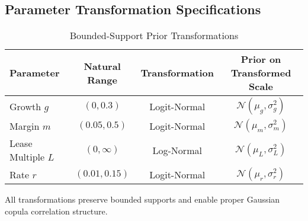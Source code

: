 \subsection{Parameter Transformation Specifications}

\begin{table}[h]
\centering
\caption{Bounded-Support Prior Transformations}
\begin{tabular}{lccc}
\toprule
Parameter & Natural Range & Transformation & Prior on Transformed Scale \\
\midrule
Growth $g$ & $(0, 0.3)$ & Logit-Normal & $\mathcal{N}(\mu_g, \sigma_g^2)$ \\
Margin $m$ & $(0.05, 0.5)$ & Logit-Normal & $\mathcal{N}(\mu_m, \sigma_m^2)$ \\
Lease Multiple $L$ & $(0, \infty)$ & Log-Normal & $\mathcal{N}(\mu_L, \sigma_L^2)$ \\
Rate $r$ & $(0.01, 0.15)$ & Logit-Normal & $\mathcal{N}(\mu_r, \sigma_r^2)$ \\
\bottomrule
\end{tabular}
\end{table}

All transformations preserve bounded supports and enable proper Gaussian copula correlation structure.
